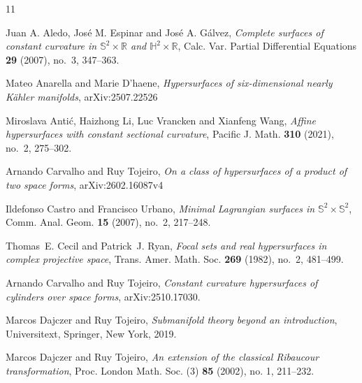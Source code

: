 \documentclass[reqno]{amsart}%
\theoremstyle{definition}
\numberwithin{equation}{section}
\begin{document}
\normalsize\noindent
\begin{thebibliography}{11}

Juan A. Aledo, Jos\'{e} M. Espinar and Jos\'{e} A. G\'{a}lvez,
\emph{Complete surfaces of constant curvature in $\mathbb{S}^2\times \mathbb{R}$ and $\mathbb{H}^2\times \mathbb{R}$}, Calc. Var. Partial Differential Equations \textbf{29} (2007), no.~3, 347--363. 

Mateo Anarella and Marie D'haene, 
\emph{Hypersurfaces of six-dimensional nearly K\"{a}hler manifolds}, 
arXiv:2507.22526

Miroslava Anti\'{c}, Haizhong Li, Luc Vrancken and Xianfeng Wang, \emph{Affine
hypersurfaces with constant sectional curvature}, Pacific J. Math.
\textbf{310} (2021), no.~2, 275--302. 



Arnando Carvalho and Ruy Tojeiro, \emph{On a class of hypersurfaces of a product of two space forms}, arXiv:2602.16087v4 



Ildefonso Castro and Francisco Urbano, \emph{Minimal {L}agrangian surfaces in
{$\mathbb{S}^2\times\mathbb{S}^2$}}, Comm. Anal. Geom. \textbf{15} (2007), no.~2,
217--248. 

Thomas~E. Cecil and Patrick~J. Ryan, \emph{Focal sets and real hypersurfaces in
complex projective space}, Trans. Amer. Math. Soc. \textbf{269} (1982),
no.~2, 481--499. 


Arnando Carvalho and Ruy Tojeiro, \emph{Constant curvature hypersurfaces of cylinders
	over space forms}, 
arXiv:2510.17030.


Marcos Dajczer and Ruy Tojeiro,
\emph{Submanifold theory beyond an introduction},
Universitext, Springer, New York, 2019.



Marcos Dajczer and Ruy Tojeiro,
\emph{An extension of the classical Ribaucour transformation},
Proc. London Math. Soc. (3) \textbf{85} (2002), no. 1, 211--232. 



\end{thebibliography}
\end{document}
